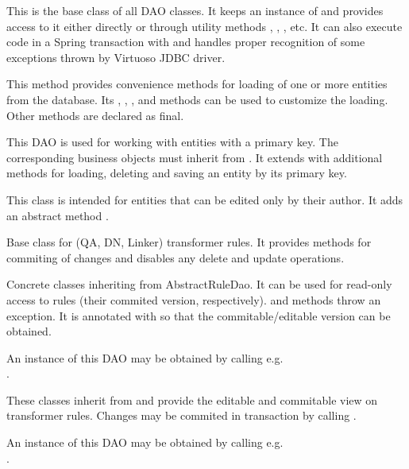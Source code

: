 \begin{description}[style=nextline,font=\ttfamily]
\begin{description}[style=nextline,font=\ttfamily]
	\item[Dao] This is the base class of all DAO classes. It keeps an instance of  and provides access to it either directly or through utility methods , , , etc. It can also execute code in a Spring transaction with  and handles proper recognition of some exceptions thrown by Virtuoso JDBC driver.
	\item[DaoTemplate] This method provides convenience methods for loading of one or more entities from the database. Its , , ,  and  methods can be used to customize the loading. Other methods are declared as final.
	\item[DaoForEntityWithSurrogateKey] This DAO is used for working with entities with a primary key. The corresponding business objects must inherit from . It extends  with additional methods for loading, deleting and saving an entity by its primary key.
	\item[DaoForAuthorableEntity] This class is intended for entities that can be edited only by their author. It adds an abstract method .
	\item[AbstractRuleDao] Base class for (QA, DN, Linker) transformer rules. It provides methods for commiting of changes and disables any delete and update operations.
	\item[XXXRuleDao] Concrete classes inheriting from AbstractRuleDao. It can be used for read-only access to rules (their commited version, respectively).  and  methods throw an exception. It is annotated with  so that the commitable/editable version can be obtained.

		An instance of this DAO may be obtained by calling e.g.\\
		.
	\item[XXXRuleUncommittedDao] These classes inherit from  and provide the editable and commitable view on transformer rules. Changes may be commited in transaction by calling .

		An instance of this DAO may be obtained by calling e.g.\\
		.
\end{description}


\end{description}
